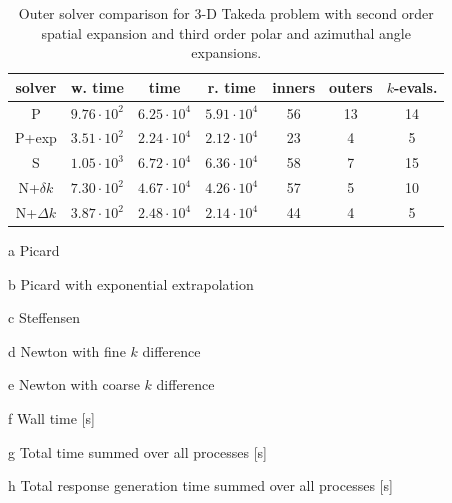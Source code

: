 \begin{table}[ht] 
 \begin{center} 
 
  \begin{threeparttable}
 \begin{tabular}{ccccccc} 
 \toprule 
  solver & w. time\tnote{f} & time\tnote{g} & r. time\tnote{h} & inners & outers & $k$-evals. \\
  \midrule
    P\tnote{a}            &  $9.76\cdot 10^2$ &  $6.25\cdot 10^4$ &  $5.91\cdot 10^4$ &           56 &           13 &           14 \\ 
    P+exp\tnote{b}       &  $3.51\cdot 10^2$ &  $2.24\cdot 10^4$ &  $2.12\cdot 10^4$ &           23 &        4 &   5  \\ 
    S\tnote{c}            &  $1.05\cdot 10^3$ &  $6.72\cdot 10^4$ &  $6.36\cdot 10^4$ &           58 &            7 &           15 \\ 
    N+$\delta k$\tnote{d}&  $7.30\cdot 10^2$ &  $4.67\cdot 10^4$ &  $4.26\cdot 10^4$ &           57 &            5 &           10 \\ 
    N+$\Delta k$\tnote{e}&  $3.87\cdot 10^2$ &  $2.48\cdot 10^4$ &  $2.14\cdot 10^4$ &           44 &          4 &           5  \\ 
 \bottomrule 
 \end{tabular} 
 
 
 {\footnotesize
 \begin{tablenotes}
   \item[a] Picard 
   \item[b] Picard with exponential extrapolation
   \item[c] Steffensen
   \item[d] Newton with fine $k$ difference
   \item[e] Newton with coarse $k$ difference
   \item[f] Wall time [s]
   \item[g] Total time summed over all processes [s]
   \item[h] Total response generation time summed over all processes [s]
 \end{tablenotes}
 }
 
 \end{threeparttable}
 
 \end{center} 
 \caption{Outer solver comparison for 3-D Takeda problem with second order 
          spatial expansion and third order polar and azimuthal angle 
          expansions.} 
 \label{tbl:takeda_outer_study} 
\end{table} 

